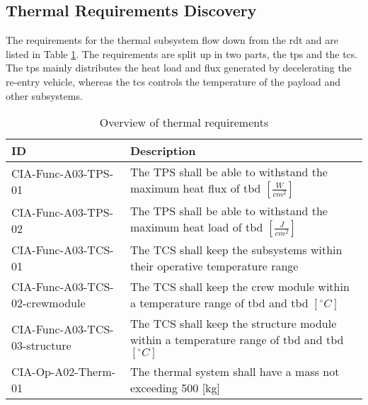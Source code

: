 \subsection{Thermal Requirements Discovery} \label{sec:therm}
The requirements for the thermal subsystem flow down from the \gls{rdt} and are listed in Table \ref{tab:thermalreq}. The requirements are split up in two parts, the \gls{tps} and the \gls{tcs}. The \gls{tps} mainly distributes the heat load and flux generated by decelerating the re-entry vehicle, whereas the \gls{tcs} controls the temperature of the payload and other subsystems.


\begin{table}[H]
	\caption{Overview of thermal requirements}
	\begin{tabular}{|p{}|p{}|}
    \hline
    ID          & Description                                                                                                      \\ \hline \hline
   CIA-Func-A03-TPS-01 & The TPS shall be able to withstand the maximum heat flux of \gls{tbd} $ \left[\frac{W}{cm^2}\right] $               
\\ \hline
    CIA-Func-A03-TPS-02 &  The TPS shall be able to withstand the maximum heat load of \gls{tbd} $ \left[\frac{J}{cm^2}\right] $               
\\ \hline
    CIA-Func-A03-TCS-01 & The TCS shall keep the subsystems within their operative temperature range                                            
\\ \hline
    CIA-Func-A03-TCS-02-crewmodule & The TCS shall keep the crew module within a temperature range of \gls{tbd} and \gls{tbd} $ \left[^{\circ}C\right] $                                        
\\ \hline
    CIA-Func-A03-TCS-03-structure & The TCS shall keep the structure module within a temperature range of \gls{tbd} and \gls{tbd} $ \left[^{\circ}C\right] $                                        
\\ \hline
	CIA-Op-A02-Therm-01 	&	The thermal system shall have a mass not exceeding 500 [kg]  							\\ \hline
    \end{tabular}
    \label{tab:thermalreq}
\end{table}

